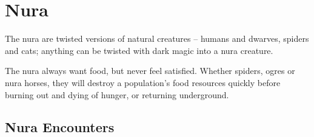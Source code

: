\chapter{Nura}

\label{nura}
The nura are twisted versions of natural creatures -- humans and dwarves, spiders and cats; anything can be twisted with dark magic into a nura creature.

The nura always want food, but never feel satisfied.  Whether spiders, ogres or nura horses, they will destroy a population's food resources quickly before burning out and dying of hunger, or returning underground.

\section{Nura Encounters}

